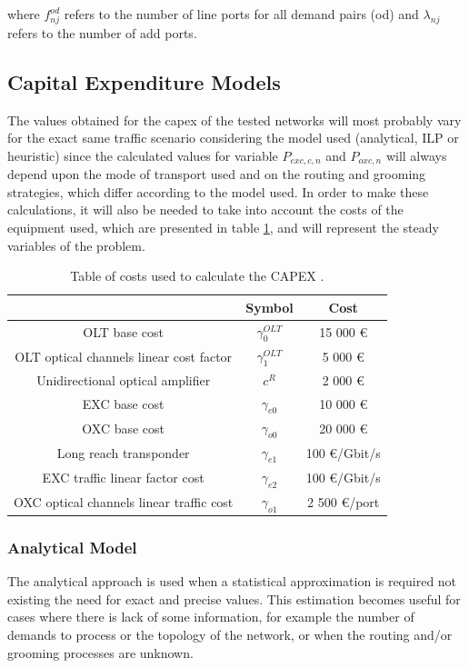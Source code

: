 \noindent
where $f_{nj}^{od}$ refers to the number of line ports for all demand pairs (od) and $\lambda_{nj}$ refers to the number of add ports.\\
\clearpage

\subsection{Capital Expenditure Models}

The values obtained for the \gls{capex} of the tested networks will most probably vary for the exact same traffic scenario considering the model used (analytical, ILP or heuristic) since the calculated values for variable $P_{exc,c,n}$ and $P_{oxc,n}$ will always depend upon the mode of transport used and on the routing and grooming strategies, which differ according to the model used. In order to make these calculations, it will also be needed to take into account the costs of the equipment used, which are presented in table \ref{table_cost}, and will represent the steady variables of the problem.




\begin{table}[H]
\centering
\begin{tabular}{| c | c | c |}
 \hline
  & Symbol & Cost \\
 \hline
 OLT base cost & $\gamma_0^{OLT}$ & 15 000 \euro \\
 OLT optical channels linear cost factor & $\gamma_1^{OLT}$ & 5 000 \euro \\
 Unidirectional optical amplifier & $c^R$ & 2 000 \euro \\
 EXC base cost & $\gamma_{e0}$ & 10 000 \euro \\
 OXC base cost & $\gamma_{o0}$ & 20 000 \euro \\
 Long reach transponder & $\gamma_{e1}$ & 100 \euro /Gbit/s\\
 EXC traffic linear factor cost & $\gamma_{e2}$ & 100 \euro/Gbit/s\\
 OXC optical channels linear traffic cost & $\gamma_{o1}$ & 2 500 \euro /port \\
 \hline
\end{tabular}
\caption{Table of costs used to calculate the CAPEX \cite{anpinto}.}
\label{table_cost}
\end{table}


\subsubsection{Analytical Model}
\label{anal}
The analytical approach is used when a statistical approximation is required not existing the need for exact and precise values. This estimation becomes useful for cases where there is lack of some information, for example the number of demands to process or the topology of the network, or when the routing and/or grooming processes are unknown. %


